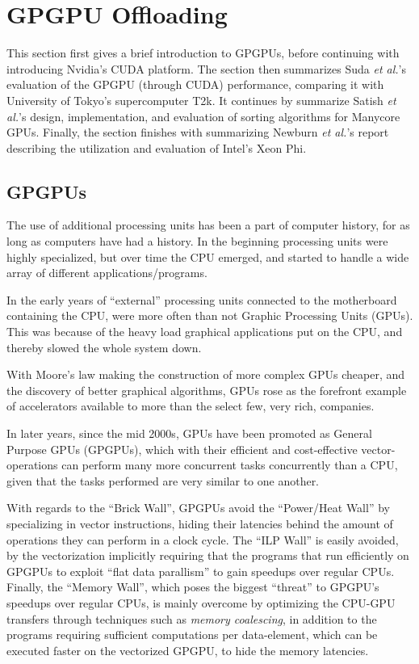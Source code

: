 
\section{GPGPU Offloading}
\label{sec:nvidia}

This section first gives a brief introduction to GPGPUs, before continuing with introducing Nvidia's CUDA platform.
The section then summarizes Suda \textit{et al.}'s\cite{Suda:2009:AGG:1509633.1509696} evaluation of the GPGPU (through CUDA) performance, comparing it with University of Tokyo's supercomputer T2k.
It continues by summarize Satish \textit{et al.}'s\cite{Satish:2009:DES:1586640.1587667} design, implementation, and evaluation of sorting algorithms for Manycore GPUs.
Finally, the section finishes with summarizing Newburn \textit{et al.}'s report describing the utilization and evaluation of Intel's Xeon Phi\texttrademark.

\subsection{GPGPUs}

The use of additional processing units has been a part of computer history, for as long as computers have had a history.
In the beginning processing units were highly specialized, but over time the CPU emerged, and started to handle a wide array of different applications/programs.

In the early years of ``external'' processing units connected to the motherboard containing the CPU, were more often than not Graphic Processing Units (GPUs).
This was because of the heavy load graphical applications put on the CPU, and thereby slowed the whole system down.

With Moore's law making the construction of more complex GPUs cheaper, and the discovery of better graphical algorithms, GPUs rose as the forefront example of accelerators available to more than the select few, very rich, companies.

In later years, since the mid 2000s, GPUs have been promoted as General Purpose GPUs (GPGPUs), which with their efficient and cost-effective vector-operations can perform many more concurrent tasks concurrently than a CPU, given that the tasks performed are very similar to one another.

With regards to the ``Brick Wall'', GPGPUs avoid the ``Power/Heat Wall'' by specializing in vector instructions, hiding their latencies behind the amount of operations they can perform in a clock cycle.
The ``ILP Wall'' is easily avoided, by the vectorization implicitly requiring that the programs that run efficiently on GPGPUs to exploit ``flat data parallism'' to gain speedups over regular CPUs.
Finally, the ``Memory Wall'', which poses the biggest ``threat'' to GPGPU's speedups over regular CPUs, is mainly overcome by optimizing the CPU-GPU transfers through techniques such as \textit{memory coalescing}, in addition to the programs requiring sufficient computations per data-element, which can be executed faster on the vectorized GPGPU, to hide the memory latencies.

